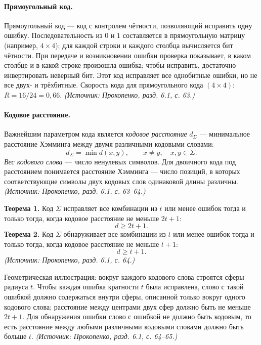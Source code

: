 \documentclass[a4paper,12pt]{article}
\begin{document}
\paragraph{Прямоугольный код.}
Прямоугольный код — код с контролем чётности, позволяющий исправить одну ошибку. Последовательность из \(0\) и \(1\) составляется в прямоугольную матрицу (например, \(4\times4\)); для каждой строки и каждого столбца вычисляется бит чётности. При передаче и возникновении ошибки проверка показывает, в каком столбце и в какой строке произошла ошибка; чтобы исправить, достаточно инвертировать неверный бит. Этот код исправляет все однобитные ошибки, но не все двух- и трёхбитные. Скорость кода для прямоугольного кода \((4\times4)\): \(R=16/24=0{,}66\).
\textit{(Источник: Прокопенко, разд. 6.1, с. 63.)}

\paragraph{Кодовое расстояние.}
Важнейшим параметром кода является \emph{кодовое расстояние} \(d_\Sigma\) — минимальное расстояние Хэмминга между двумя различными кодовыми словами:
\[
d_\Sigma=\min d(x,y),\qquad x\ne y,\quad x,y\in\Sigma.
\]
\emph{Вес кодового слова} — число ненулевых символов. Для двоичного кода под расстоянием понимается расстояние Хэмминга — число позиций, в которых соответствующие символы двух кодовых слов одинаковой длины различны.
\textit{(Источник: Прокопенко, разд. 6.1, с. 63--64.)}

\textbf{Теорема 1.} Код \(\Sigma\) исправляет все комбинации из \(t\) или менее ошибок тогда и только тогда, когда кодовое расстояние не меньше \(2t+1\):
\[
d\ge 2t+1.
\]
\textbf{Теорема 2.} Код \(\Sigma\) обнаруживает все комбинации из \(t\) или менее ошибок тогда и только тогда, когда кодовое расстояние не меньше \(t+1\):
\[
d\ge t+1.
\]
\textit{(Источник: Прокопенко, разд. 6.1, с. 64.)}

Геометрическая иллюстрация: вокруг каждого кодового слова строятся сферы радиуса \(t\). Чтобы каждая ошибка кратности \(t\) была исправлена, слово с такой ошибкой должно содержаться внутри сферы, описанной только вокруг одного кодового слова; расстояние между центрами двух сфер должно быть не меньше \(2t+1\). Для обнаружения ошибки слово с ошибкой не должно быть кодовым, то есть расстояние между любыми различными кодовыми словами должно быть больше \(t\).
\textit{(Источник: Прокопенко, разд. 6.1, с. 64--65.)}
\end{document}
